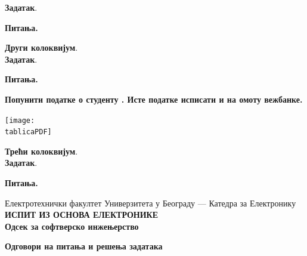 \documentclass[10pt, a4paper]{article}
\newcommand{\ID}[0]{0}
\newcommand{\printheader}
{
\begin{flushright}
    \hfill
    \datumIspita
\end{flushright}
\vspace*{-35pt}
\begin{center}
    Електротехнички факултет 
    Универзитета у Београду --- Катедра за Електронику \\
    \textbf{ИСПИТ ИЗ ОСНОВА ЕЛЕКТРОНИКЕ \\ Одсек за софтверско инжењерство}
\end{center}
}
\begin{document}
\vspace*{0mm}
\noindent
\textbf{Задатак}. \\[0.5mm]
\renewcommand{\ID}{1}

\noindent\textbf{Питања.} \\[.5mm]
%
\renewcommand{\ID}{1}

\renewcommand{\ID}{2}


\newpage 
\noindent
\textbf{\large Други колоквијум}. \hrulefill \\
\noindent
\textbf{Задатак}. \\[0.5mm]
\renewcommand{\ID}{2}

\noindent\textbf{Питања.} \\[1mm]
%
\renewcommand{\ID}{3}

\renewcommand{\ID}{4}

\newpage

\vspace{2mm}
\noindent
\textbf{Попунити податке о студенту 
. Исте податке 
исписати и на омоту вежбанке.
} 
%
\begin{center}
\vspace*{0mm} 
\texttt{[image: \\tablicaPDF]}
\end{center}

\noindent
\textbf{\large Трећи колоквијум}. \hrulefill \\

\vspace*{2mm}
\noindent
\textbf{Задатак}. \\[0.5mm]
\renewcommand{\ID}{3}

\vspace{5mm}
\noindent\textbf{Питања.} 

\renewcommand{\ID}{5}

\vspace*{2mm}
\renewcommand{\ID}{6}




\newpage

\printheader
\begin{center}    
    \large \textbf{Одговори на питања 
    и решења задатака}    
\end{center}
\end{document}
